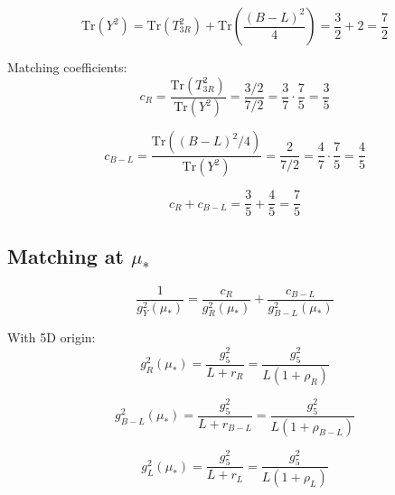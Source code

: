 \documentclass[11pt,a4paper]{article}
\theoremstyle{definition}
\begin{document}
\begin{equation}
\label{eq:trace_Y}
\text{Tr}(Y^2) = \text{Tr}(T_{3R}^2) + \text{Tr}\left(\frac{(B-L)^2}{4}\right) = \frac{3}{2} + 2 = \frac{7}{2}
\end{equation}

Matching coefficients:
\begin{equation}
\label{eq:cR}
c_R = \frac{\text{Tr}(T_{3R}^2)}{\text{Tr}(Y^2)} = \frac{3/2}{7/2} = \frac{3}{7} \cdot \frac{7}{5} = \frac{3}{5}
\end{equation}

\begin{equation}
\label{eq:cBL}
c_{B-L} = \frac{\text{Tr}((B-L)^2/4)}{\text{Tr}(Y^2)} = \frac{2}{7/2} = \frac{4}{7} \cdot \frac{7}{5} = \frac{4}{5}
\end{equation}

\begin{equation}
\label{eq:c_sum}
c_R + c_{B-L} = \frac{3}{5} + \frac{4}{5} = \frac{7}{5}
\end{equation}

\subsection{Matching at $\mu_*$}
\label{subsec:matching_mustar}

\begin{equation}
\label{eq:matching_full}
\frac{1}{g_Y^2(\mu_*)} = \frac{c_R}{g_R^2(\mu_*)} + \frac{c_{B-L}}{g_{B-L}^2(\mu_*)}
\end{equation}

With 5D origin:
\begin{equation}
\label{eq:gR_5D}
g_R^2(\mu_*) = \frac{g_5^2}{L + r_R} = \frac{g_5^2}{L(1 + \rho_R)}
\end{equation}

\begin{equation}
\label{eq:gBL_5D}
g_{B-L}^2(\mu_*) = \frac{g_5^2}{L + r_{B-L}} = \frac{g_5^2}{L(1 + \rho_{B-L})}
\end{equation}

\begin{equation}
\label{eq:gL_5D}
g_L^2(\mu_*) = \frac{g_5^2}{L + r_L} = \frac{g_5^2}{L(1 + \rho_L)}
\end{equation}

\end{document}
